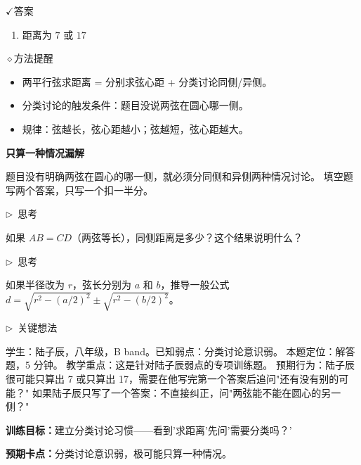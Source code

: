 \documentclass{exam-zh}
\newcommand{\edukai}{\kaishu}
\newcommand{\eduSubTitle}[1]{%
  \needspace{4\baselineskip}%
  \vspace{1mm}
  {\color{edu-blue}\bfseries #1}\par
  \vspace{1mm}
}
\newenvironment{eduAuxItem}[1]{%
  \needspace{4\baselineskip}%
  \vspace{2mm}
  \par\noindent
  \hangindent=8mm\hangafter=1
  {\color{edu-blue}\edukai $\triangleright$~#1}\enspace
  \begingroup
  \color{edu-ink}
  \edukai
}{%
  \endgroup
  \par
  \vspace{4mm}
}
\newcommand{\eduIconCheck}{\(\checkmark\)}
\newcommand{\eduIconPin}{\(\diamond\)}
\newenvironment{eduBulletList}{%
  \begin{itemize}[
    label=\textbullet,
    leftmargin=5mm,
    itemsep=1.2mm,
    topsep=0pt,
    parsep=0pt
  ]
}{%
  \end{itemize}
}
\newenvironment{eduBottomGrid}{%
  \vspace{1mm}
  \par\noindent
}{%
  \par\vspace{1mm}
}
\newenvironment{eduSummaryLeft}{%
  \begin{minipage}[t]{0.30\linewidth}
}{%
  \end{minipage}
}
\newcommand{\eduSummaryDivider}{%
  \hspace{4mm}{\color{edu-line}\vrule width 0.35pt}\hspace{7mm}%
}
\newenvironment{eduSummaryRight}{%
  \begin{minipage}[t]{0.58\linewidth}
}{%
  \end{minipage}
}
\newenvironment{eduPlainList}{%
  \begin{enumerate}[
    label=(\arabic*),
    leftmargin=7mm,
    itemsep=1.2mm,
    topsep=0pt,
    parsep=0pt
  ]
}{%
  \end{enumerate}
}
\begin{document}
\begin{eduBottomGrid}
  \begin{eduSummaryLeft}
    \begin{eduSummaryBlock}{\eduIconCheck}{答案}
    \begin{eduPlainList}
      \item 距离为 $7$ 或 $17$    \end{eduPlainList}
    \end{eduSummaryBlock}
  \end{eduSummaryLeft}
  \eduSummaryDivider
  \begin{eduSummaryRight}
    \begin{eduSummaryBlock}{\eduIconPin}{方法提醒}
    \begin{eduBulletList}
      \item 两平行弦求距离 = 分别求弦心距 + 分类讨论同侧/异侧。      \item 分类讨论的触发条件：题目没说两弦在圆心哪一侧。      \item 规律：弦越长，弦心距越小；弦越短，弦心距越大。    \end{eduBulletList}
    \end{eduSummaryBlock}
  \end{eduSummaryRight}
\end{eduBottomGrid}




\begin{eduMistakeBox}
\eduSubTitle{只算一种情况漏解}题目没有明确两弦在圆心的哪一侧，就必须分同侧和异侧两种情况讨论。
填空题写两个答案，只写一个扣一半分。
\end{eduMistakeBox}




\begin{eduAuxItem}{思考}
如果 $AB = CD$（两弦等长），同侧距离是多少？这个结果说明什么？\end{eduAuxItem}




\begin{eduAuxItem}{思考}
如果半径改为 $r$，弦长分别为 $a$ 和 $b$，推导一般公式 $d = \sqrt{r^2 - (a/2)^2} \pm \sqrt{r^2 - (b/2)^2}$。\end{eduAuxItem}



\clearpage

\begin{eduAuxItem}{关键想法}
学生：陆子辰，八年级，B band。已知弱点：分类讨论意识弱。
本题定位：解答题，5 分钟。
教学重点：这是针对陆子辰弱点的专项训练题。
预期行为：陆子辰很可能只算出 7 或只算出 17，需要在他写完第一个答案后追问"还有没有别的可能？"
如果陆子辰只写了一个答案：不直接纠正，问"两弦能不能在圆心的另一侧？"
\end{eduAuxItem}


\begin{eduTeacherNote}
  \textbf{训练目标：}建立分类讨论习惯——看到'求距离'先问'需要分类吗？'\par
  \textbf{预期卡点：}分类讨论意识弱，极可能只算一种情况。
\end{eduTeacherNote}
\end{document}
